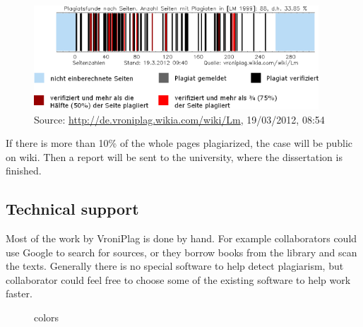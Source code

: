 \begin{figure}[!h]
  \centering
    \includegraphics[width=0.95\textwidth]{images/vroni-barcode.png}
  \caption{Source: \url{http://de.vroniplag.wikia.com/wiki/Lm}, 19/03/2012, 08:54}
  \label{fig:vroniBarcode}
\end{figure}



If there is more than 10\% of the whole pages plagiarized, the case will be public on wiki. Then a report will be sent 
to the university, where the dissertation is finished.

\subsection{Technical support}

Most of the work by VroniPlag is done by hand. For example collaborators could use Google to search for sources, 
or they borrow books from the library and scan the texts. Generally there is no special software to help detect 
plagiarism, but collaborator could feel free to choose some of the existing software to help work faster.


	 \begin{figure}[!h]
  \centering
  \caption{colors}
  \label{fig:colors}
\end{figure}

	
